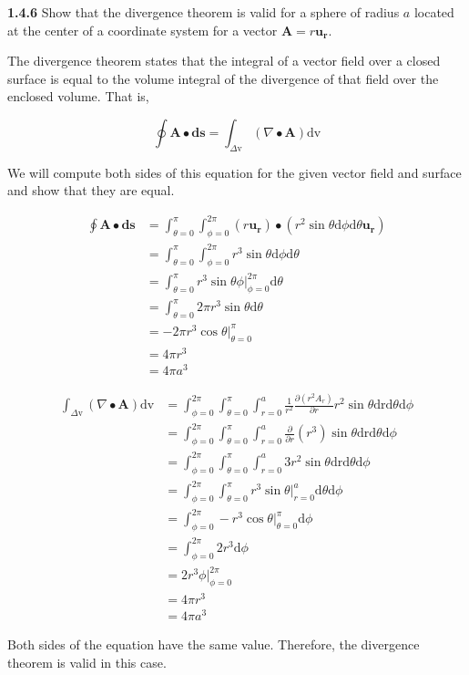 \documentclass{article}
\begin{document}
\textbf{1.4.6} Show that the divergence theorem is valid for a sphere of radius $a$ located at the center of a
coordinate system for a vector $\mathbf{A} = r\mathbf{u_r}$.

\vspace{24pt}

The divergence theorem states that the integral of a vector field over a closed surface is equal to the volume integral
of the divergence of that field over the enclosed volume. That is,

\begin{equation*}
	\oint \mathbf{A} \bullet \mathbf{ds} = \int_{\Delta \text{v}} (\nabla \bullet \mathbf{A})\text{dv}
\end{equation*}

We will compute both sides of this equation for the given vector field and surface and show that they are equal.

\begin{equation*}
	\begin{split}
		\oint \mathbf{A} \bullet \mathbf{ds} & = \int_{\theta=0}^\pi \int_{\phi=0}^{2\pi} (r\mathbf{u_r}) \bullet (r^2 \sin\theta \text{d}\phi \text{d}\theta\mathbf{u_r}) \\
		& = \int_{\theta=0}^\pi \int_{\phi=0}^{2\pi} r^3 \sin\theta \text{d}\phi \text{d}\theta \\
		& = \int_{\theta=0}^\pi r^3 \sin\theta \phi \rvert_{\phi=0}^{2\pi} \text{d}\theta \\
		& = \int_{\theta=0}^\pi 2\pi r^3 \sin\theta \text{d}\theta \\
		& = -2\pi r^3 \cos\theta \rvert_{\theta=0}^{\pi} \\
		& = 4\pi r^3 \\
		& = 4\pi a^3
	\end{split}
\end{equation*}

\begin{equation*}
	\begin{split}
		\int_{\Delta \text{v}} (\nabla \bullet \mathbf{A})\text{dv} & = \int_{\phi=0}^{2\pi} \int_{\theta=0}^\pi \int_{r=0}^a \frac{1}{r^2} \frac{\partial(r^2 A_r)}{\partial r} r^2 \sin\theta \text{drd}\theta\text{d}\phi \\
		& = \int_{\phi=0}^{2\pi} \int_{\theta=0}^\pi \int_{r=0}^a \frac{\partial}{\partial r}(r^3) \sin\theta \text{drd}\theta\text{d}\phi \\
		& = \int_{\phi=0}^{2\pi} \int_{\theta=0}^\pi \int_{r=0}^a 3r^2 \sin\theta \text{drd}\theta\text{d}\phi \\
		& = \int_{\phi=0}^{2\pi} \int_{\theta=0}^\pi r^3 \sin\theta \rvert_{r=0}^a \text{d}\theta\text{d}\phi \\
		& = \int_{\phi=0}^{2\pi} -r^3 \cos\theta \rvert_{\theta=0}^\pi \text{d}\phi \\
		& = \int_{\phi=0}^{2\pi} 2r^3 \text{d}\phi \\
		& = 2r^3 \phi\rvert_{\phi=0}^{2\pi} \\
		& = 4\pi r^3 \\
		& = 4\pi a^3
	\end{split}
\end{equation*}

Both sides of the equation have the same value. Therefore, the divergence theorem is valid in this case.
\end{document}
